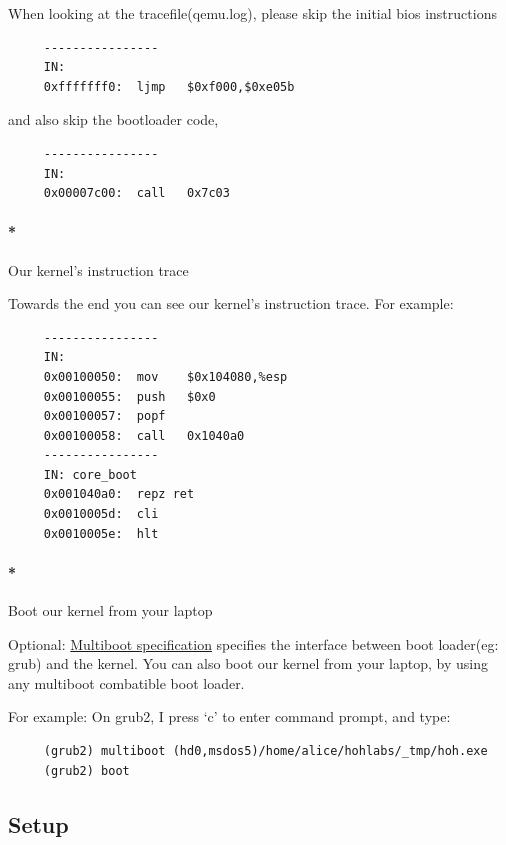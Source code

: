 \documentclass[]{article}
\let\oldparagraph\paragraph
\renewcommand{\paragraph}[1]{\oldparagraph{#1}\mbox{}}
\begin{document}
When looking at the tracefile(qemu.log), please skip the initial bios
instructions

\begin{verbatim}
     ----------------
     IN:
     0xfffffff0:  ljmp   $0xf000,$0xe05b
\end{verbatim}

and also skip the bootloader code,

\begin{verbatim}
     ----------------
     IN:
     0x00007c00:  call   0x7c03
\end{verbatim}

\paragraph*{Our kernel's instruction
trace}\label{our-kernels-instruction-trace}

Towards the end you can see our kernel's instruction trace. For example:

\begin{verbatim}
     ----------------
     IN:
     0x00100050:  mov    $0x104080,%esp
     0x00100055:  push   $0x0
     0x00100057:  popf
     0x00100058:  call   0x1040a0
     ----------------
     IN: core_boot
     0x001040a0:  repz ret
     0x0010005d:  cli
     0x0010005e:  hlt
\end{verbatim}

\paragraph*{Boot our kernel from your
laptop}\label{boot-our-kernel-from-your-laptop}

Optional:
\href{http://www.gnu.org/software/grub/manual/multiboot/multiboot.pdf}{Multiboot
specification} specifies the interface between boot loader(eg: grub) and
the kernel. You can also boot our kernel from your laptop, by using any
multiboot combatible boot loader.

For example: On grub2, I press `c' to enter command prompt, and type:

\begin{verbatim}
     (grub2) multiboot (hd0,msdos5)/home/alice/hohlabs/_tmp/hoh.exe
     (grub2) boot
\end{verbatim}

\subsection*{Setup}\label{setup}
\end{document}
